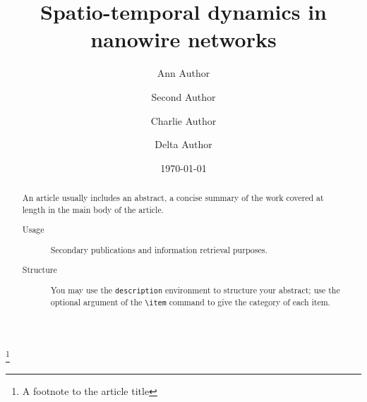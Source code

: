 \documentclass[%
 reprint,
 amsmath,amssymb,
 aps,
]{revtex4-2}
\begin{document}

\title{Spatio-temporal dynamics in nanowire networks}%
\thanks{A footnote to the article title}%

\author{Ann Author}
\author{Second Author}%
%


\author{Charlie Author}
%
%
\author{Delta Author}
%


\date{\today}%

\begin{abstract}
An article usually includes an abstract, a concise summary of the work
covered at length in the main body of the article. 
\begin{description}
\item[Usage]
Secondary publications and information retrieval purposes.
\item[Structure]
You may use the \texttt{description} environment to structure your abstract;
use the optional argument of the \verb+\item+ command to give the category of each item. 
\end{description}
\end{abstract}

\maketitle
\end{document}
